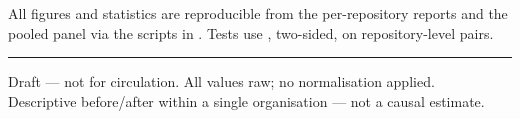 \documentclass[11pt,a4paper]{article}
\begin{document}
All figures and statistics are reproducible from the per-repository reports and
the pooled panel  via the scripts in
. Tests use , two-sided, on
repository-level pairs.

\vspace{1em}
{\color{rule}\rule{\linewidth}{0.5pt}}
\vspace{0.5em}

{\ttfamily\scriptsize\color{muted}
Draft --- not for circulation. All values raw; no normalisation applied.\\
Descriptive before/after within a single organisation --- not a causal estimate.}



\end{document}
